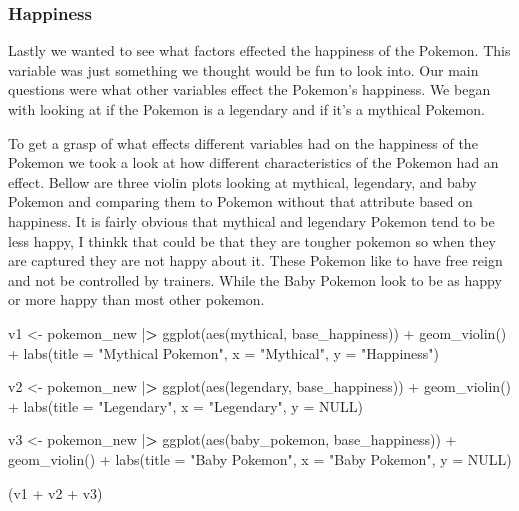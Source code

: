 \documentclass[
]{article}
\newenvironment{Shaded}{\begin{snugshade}}{\end{snugshade}}
\newcommand{\AttributeTok}[1]{\textcolor[rgb]{0.77,0.63,0.00}{#1}}
\newcommand{\ConstantTok}[1]{\textcolor[rgb]{0.00,0.00,0.00}{#1}}
\newcommand{\ErrorTok}[1]{\textcolor[rgb]{0.64,0.00,0.00}{\textbf{#1}}}
\newcommand{\FunctionTok}[1]{\textcolor[rgb]{0.00,0.00,0.00}{#1}}
\newcommand{\NormalTok}[1]{#1}
\newcommand{\OtherTok}[1]{\textcolor[rgb]{0.56,0.35,0.01}{#1}}
\newcommand{\SpecialCharTok}[1]{\textcolor[rgb]{0.00,0.00,0.00}{#1}}
\newcommand{\StringTok}[1]{\textcolor[rgb]{0.31,0.60,0.02}{#1}}
\begin{document}
\hypertarget{happiness}{%
\subsubsection{Happiness}\label{happiness}}

Lastly we wanted to see what factors effected the happiness of the
Pokemon. This variable was just something we thought would be fun to
look into. Our main questions were what other variables effect the
Pokemon's happiness. We began with looking at if the Pokemon is a
legendary and if it's a mythical Pokemon.

To get a grasp of what effects different variables had on the happiness
of the Pokemon we took a look at how different characteristics of the
Pokemon had an effect. Bellow are three violin plots looking at
mythical, legendary, and baby Pokemon and comparing them to Pokemon
without that attribute based on happiness. It is fairly obvious that
mythical and legendary Pokemon tend to be less happy, I thinkk that
could be that they are tougher pokemon so when they are captured they
are not happy about it. These Pokemon like to have free reign and not be
controlled by trainers. While the Baby Pokemon look to be as happy or
more happy than most other pokemon.

\begin{Shaded}
\begin{Highlighting}[]
\NormalTok{v1 }\OtherTok{\textless{}{-}}\NormalTok{ pokemon\_new }\SpecialCharTok{|}\ErrorTok{\textgreater{}} \FunctionTok{ggplot}\NormalTok{(}\FunctionTok{aes}\NormalTok{(mythical, base\_happiness)) }\SpecialCharTok{+}
  \FunctionTok{geom\_violin}\NormalTok{() }\SpecialCharTok{+}
  \FunctionTok{labs}\NormalTok{(}\AttributeTok{title =} \StringTok{"Mythical Pokemon"}\NormalTok{, }\AttributeTok{x =} \StringTok{"Mythical"}\NormalTok{, }\AttributeTok{y =} \StringTok{"Happiness"}\NormalTok{)}

\NormalTok{v2 }\OtherTok{\textless{}{-}}\NormalTok{ pokemon\_new }\SpecialCharTok{|}\ErrorTok{\textgreater{}} \FunctionTok{ggplot}\NormalTok{(}\FunctionTok{aes}\NormalTok{(legendary, base\_happiness)) }\SpecialCharTok{+}
  \FunctionTok{geom\_violin}\NormalTok{() }\SpecialCharTok{+}
  \FunctionTok{labs}\NormalTok{(}\AttributeTok{title =} \StringTok{"Legendary"}\NormalTok{, }\AttributeTok{x =} \StringTok{"Legendary"}\NormalTok{, }\AttributeTok{y =} \ConstantTok{NULL}\NormalTok{)}

\NormalTok{v3 }\OtherTok{\textless{}{-}}\NormalTok{ pokemon\_new }\SpecialCharTok{|}\ErrorTok{\textgreater{}} \FunctionTok{ggplot}\NormalTok{(}\FunctionTok{aes}\NormalTok{(baby\_pokemon, base\_happiness)) }\SpecialCharTok{+}
  \FunctionTok{geom\_violin}\NormalTok{() }\SpecialCharTok{+}
  \FunctionTok{labs}\NormalTok{(}\AttributeTok{title =} \StringTok{"Baby Pokemon"}\NormalTok{, }\AttributeTok{x =} \StringTok{"Baby Pokemon"}\NormalTok{, }\AttributeTok{y =} \ConstantTok{NULL}\NormalTok{)}

\NormalTok{(v1 }\SpecialCharTok{+}\NormalTok{ v2 }\SpecialCharTok{+}\NormalTok{ v3)}
\end{Highlighting}
\end{Shaded}
\end{document}
